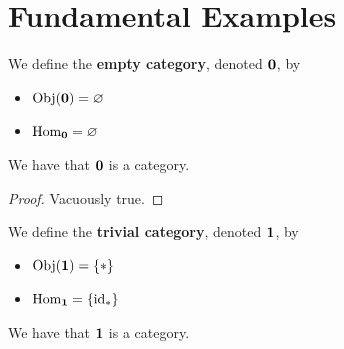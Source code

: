 \documentclass{book}
\begin{document}
	
	
	
	
	
	
	
	
	
	
	
	
	
	
	
	
	
	
	
	
	
	
	
	
	
	
	
	
	
	
	
	
	
	
	
	
	
	
	
	
	
	
	\section{Fundamental Examples}

	\begin{defn} 
		We define the \textbf{empty category}, denoted $\mathbf{0}$, by 
		\begin{itemize}
			\item $\operatorname{Obj}(\mathbf{0}) = \varnothing$
			\item $\operatorname{Hom}_{\mathbf{0}} = \varnothing$
		\end{itemize}
	\end{defn}

	\begin{ex} 
		We have that $\mathbf{0}$ is a category.
	\end{ex}
	
	\begin{proof}
		Vacuously true.
	\end{proof}

	\begin{defn} 
		We define the \textbf{trivial category}, denoted $\mathbf{1}$, by 
		\begin{itemize}
			\item $\operatorname{Obj}(\mathbf{1}) = \{*\}$
			\item $\operatorname{Hom}_{\mathbf{1}} = \{\operatorname{id}_*\}$
		\end{itemize}
	\end{defn}

	\begin{ex} 
		We have that $\mathbf{1}$ is a category.
	\end{ex}
\end{document}
